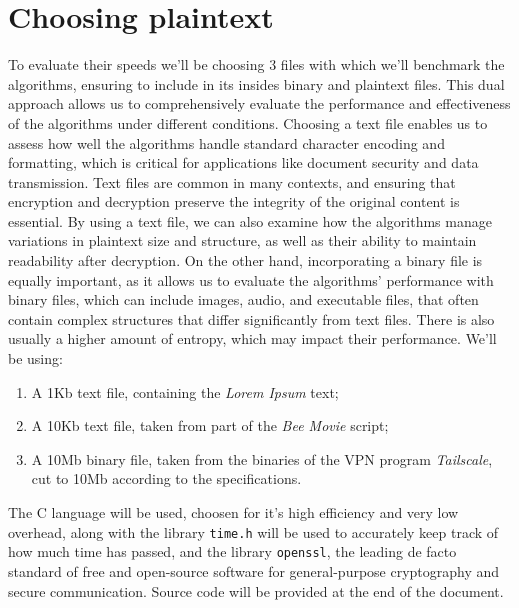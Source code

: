 \documentclass{article}
\begin{document}
\section{Choosing plaintext}
To evaluate their speeds we'll be choosing 3 files with which we'll benchmark the algorithms, ensuring to include in its insides binary and plaintext files. This dual approach allows us to comprehensively evaluate the performance and effectiveness of the algorithms under different conditions.
Choosing a text file enables us to assess how well the algorithms handle standard character encoding and formatting, which is critical for applications like document security and data transmission. Text files are common in many contexts, and ensuring that encryption and decryption preserve the integrity of the original content is essential. By using a text file, we can also examine how the algorithms manage variations in plaintext size and structure, as well as their ability to maintain readability after decryption.
On the other hand, incorporating a binary file is equally important, as it allows us to evaluate the algorithms' performance with binary files, which can include images, audio, and executable files, that often contain complex structures that differ significantly from text files. There is also usually a higher amount of entropy, which may impact their performance.
We'll be using:
\begin{enumerate}
    \item A 1Kb text file, containing the \emph{Lorem Ipsum} text;
    \item A 10Kb text file, taken from part of the \emph{Bee Movie} script;
    \item A 10Mb binary file, taken from the binaries of the VPN program \emph{Tailscale}, cut to 10Mb according to the specifications.
\end{enumerate}
The C language will be used, choosen for it's high efficiency and very low overhead, along with the library \texttt{time.h} will be used to accurately keep track of how much time has passed, and the library \texttt{openssl}, the leading de facto standard of free and open-source software for general-purpose cryptography and secure communication.
Source code will be provided at the end of the document.
\end{document}
